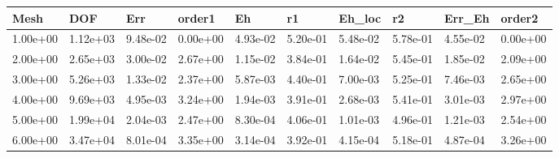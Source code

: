 \begin{tabular}{llllllllll}
Mesh & DOF & Err & order1 & Eh & r1 & Eh_loc & r2 & Err_Eh & order2 \\ 
\hline 
1.00e+00 & 1.12e+03 & 9.48e-02 & 0.00e+00 & 4.93e-02 & 5.20e-01 & 5.48e-02 & 5.78e-01 & 4.55e-02 & 0.00e+00 \\ 
2.00e+00 & 2.65e+03 & 3.00e-02 & 2.67e+00 & 1.15e-02 & 3.84e-01 & 1.64e-02 & 5.45e-01 & 1.85e-02 & 2.09e+00 \\ 
3.00e+00 & 5.26e+03 & 1.33e-02 & 2.37e+00 & 5.87e-03 & 4.40e-01 & 7.00e-03 & 5.25e-01 & 7.46e-03 & 2.65e+00 \\ 
4.00e+00 & 9.69e+03 & 4.95e-03 & 3.24e+00 & 1.94e-03 & 3.91e-01 & 2.68e-03 & 5.41e-01 & 3.01e-03 & 2.97e+00 \\ 
5.00e+00 & 1.99e+04 & 2.04e-03 & 2.47e+00 & 8.30e-04 & 4.06e-01 & 1.01e-03 & 4.96e-01 & 1.21e-03 & 2.54e+00 \\ 
6.00e+00 & 3.47e+04 & 8.01e-04 & 3.35e+00 & 3.14e-04 & 3.92e-01 & 4.15e-04 & 5.18e-01 & 4.87e-04 & 3.26e+00 \\ 
\hline 
\end{tabular}